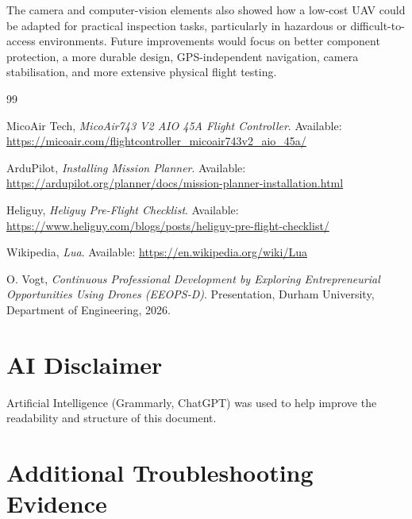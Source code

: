 \documentclass[conference]{IEEEtran}
\begin{document}
The camera and computer-vision elements also showed how a low-cost UAV could be adapted for practical inspection tasks, particularly in hazardous or difficult-to-access environments. Future improvements would focus on better component protection, a more durable design, GPS-independent navigation, camera stabilisation, and more extensive physical flight testing.

\begin{thebibliography}{99}

MicoAir Tech,
\textit{MicoAir743 V2 AIO 45A Flight Controller}.
Available: \url{https://micoair.com/flightcontroller_micoair743v2_aio_45a/}

ArduPilot,
\textit{Installing Mission Planner}.
Available: \url{https://ardupilot.org/planner/docs/mission-planner-installation.html}

Heliguy,
\textit{Heliguy Pre-Flight Checklist}.
Available: \url{https://www.heliguy.com/blogs/posts/heliguy-pre-flight-checklist/}

Wikipedia,
\textit{Lua}.
Available: \url{https://en.wikipedia.org/wiki/Lua}

O. Vogt,
\textit{Continuous Professional Development by Exploring Entrepreneurial Opportunities Using Drones (EEOPS-D)}.
Presentation, Durham University, Department of Engineering, 2026.

\end{thebibliography}\textbf{}


\section*{AI Disclaimer}

Artificial Intelligence (Grammarly, ChatGPT) was used to help improve the readability and structure of this document.
\onecolumn


\appendices


\section*{Additional Troubleshooting Evidence}
\label{app:troubleshooting}
\end{document}
